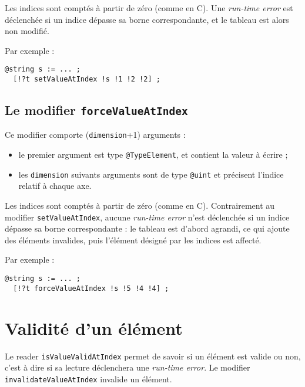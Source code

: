 Les indices sont comptés à partir de zéro (comme en C). Une \emph{run-time error} est déclenchée si un indice dépasse sa borne correspondante, et le tableau est alors non modifié.

Par exemple :
\begin{lstlisting}[language=galgas]
  @string s := ... ;
  [!?t setValueAtIndex !s !1 !2 !2] ;
\end{lstlisting}





\subsection{Le modifier \lstinline[language=galgas]!forceValueAtIndex!}

Ce modifier comporte (\lstinline[language=galgas]!dimension!+1) arguments :
\begin{itemize}
  \item le premier argument est type \lstinline[language=galgas]!@TypeElement!, et contient la valeur à écrire ;
  \item les \lstinline[language=galgas]!dimension! suivants arguments sont de type \lstinline[language=galgas]!@uint! et précisent l'indice relatif à chaque axe.
\end{itemize} 
  
Les indices sont comptés à partir de zéro (comme en C). Contrairement au modifier \lstinline[language=galgas]!setValueAtIndex!, aucune \emph{run-time error} n'est déclenchée si un indice dépasse sa borne correspondante : le tableau est d'abord agrandi, ce qui ajoute des éléments invalides, puis l'élément désigné par les indices est affecté.

Par exemple :
\begin{lstlisting}[language=galgas]
  @string s := ... ;
  [!?t forceValueAtIndex !s !5 !4 !4] ;
\end{lstlisting}





\section{Validité d'un élément}

Le reader \lstinline[language=galgas]!isValueValidAtIndex! permet de savoir si un élément est valide ou non, c'est à dire si sa lecture déclenchera une \emph{run-time error}. Le modifier \lstinline[language=galgas]!invalidateValueAtIndex! invalide un élément.

